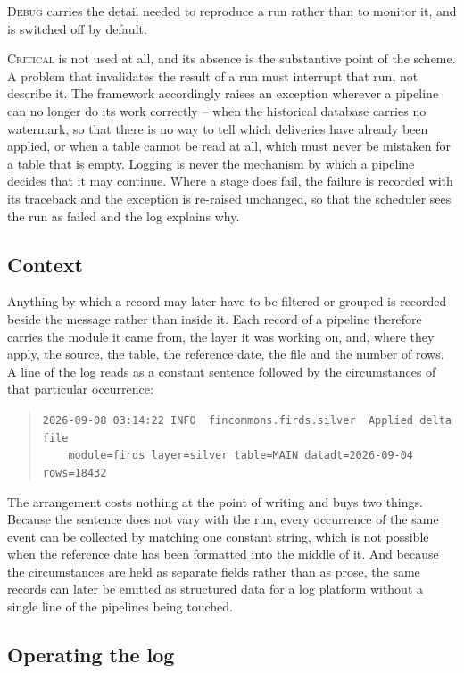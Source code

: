 \documentclass[a4paper, 11pt]{report}
\begin{document}
\textsc{Debug} carries the detail needed to reproduce a run rather than to monitor it, and is switched off by default.

\textsc{Critical} is not used at all, and its absence is the substantive point of the scheme. A problem that invalidates the result of a run must interrupt that run, not describe it. The framework accordingly raises an exception wherever a pipeline can no longer do its work correctly -- when the historical database carries no watermark, so that there is no way to tell which deliveries have already been applied, or when a table cannot be read at all, which must never be mistaken for a table that is empty. Logging is never the mechanism by which a pipeline decides that it may continue. Where a stage does fail, the failure is recorded with its traceback and the exception is re-raised unchanged, so that the scheduler sees the run as failed and the log explains why.

\subsection{Context}

Anything by which a record may later have to be filtered or grouped is recorded beside the message rather than inside it. Each record of a pipeline therefore carries the module it came from, the layer it was working on, and, where they apply, the source, the table, the reference date, the file and the number of rows. A line of the log reads as a constant sentence followed by the circumstances of that particular occurrence:

\begin{quote}
\small
\verb|2026-09-08 03:14:22 INFO  fincommons.firds.silver  Applied delta file|\\
\verb|    module=firds layer=silver table=MAIN datadt=2026-09-04 rows=18432|
\end{quote}

The arrangement costs nothing at the point of writing and buys two things. Because the sentence does not vary with the run, every occurrence of the same event can be collected by matching one constant string, which is not possible when the reference date has been formatted into the middle of it. And because the circumstances are held as separate fields rather than as prose, the same records can later be emitted as structured data for a log platform without a single line of the pipelines being touched.

\subsection{Operating the log}
\end{document}
